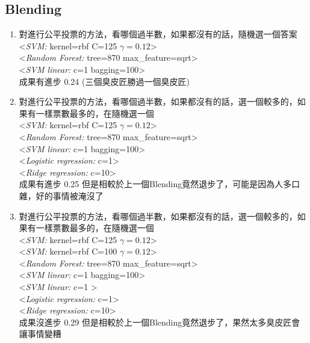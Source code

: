 \documentclass[12pt]{article}
\theoremstyle{definition}
\theoremstyle{remark}
\begin{document}
\subsection{Blending}
\begin{enumerate}
  \item 對進行公平投票的方法，看哪個過半數，如果都沒有的話，隨機選一個答案\\
    <{\em SVM:\/} kernel=rbf C=125 $ \gamma = 0.12 $>\\ 
    <{\em Random Forest:\/} tree=870 max\_feature=sqrt> \\
    <{\em SVM linear:\/} c=1 bagging=100>\\
    成果有進步 0.24 (三個臭皮匠勝過一個臭皮匠)
  \item 對進行公平投票的方法，看哪個過半數，如果都沒有的話，選一個較多的，如果有一樣票數最多的，在隨機選一個\\
    <{\em SVM:\/} kernel=rbf C=125 $ \gamma = 0.12 $>\\ 
    <{\em Random Forest:\/} tree=870 max\_feature=sqrt> \\
    <{\em SVM linear:\/} c=1 bagging=100>\\
    <{\em Logistic regression:\/} c=1>\\
    <{\em Ridge regression:\/} c=10>\\
    成果有進步 0.25 但是相較於上一個Blending竟然退步了，可能是因為人多口雜，好的事情被淹沒了
  \item 對進行公平投票的方法，看哪個過半數，如果都沒有的話，選一個較多的，如果有一樣票數最多的，在隨機選一個\\
    <{\em SVM:\/} kernel=rbf C=125 $ \gamma = 0.12 $>\\ 
    <{\em SVM:\/} kernel=rbf C=100 $ \gamma = 0.12 $>\\ 
    <{\em Random Forest:\/} tree=870 max\_feature=sqrt> \\
    <{\em SVM linear:\/} c=1 bagging=100>\\
    <{\em SVM linear:\/} c=1 >\\
    <{\em Logistic regression:\/} c=1>\\
    <{\em Ridge regression:\/} c=10>\\
    成果沒進步 0.29 但是相較於上一個Blending竟然退步了，果然太多臭皮匠會讓事情變糟
\end{enumerate}
\end{document}

